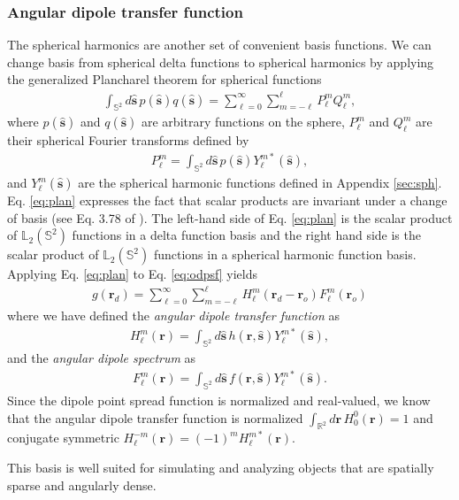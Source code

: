 \documentclass[]{osa-article}
\providecommand{\mb}[1]{\mathbf{#1}}
\providecommand{\ro}{\mathbf{\mathbf{r}}_o}
\providecommand{\rd}{\mathbf{r}_d}
\providecommand{\mh}[1]{\mathbf{\hat{#1}}}
\providecommand{\mbb}[1]{\mathbb{#1}}
\providecommand{\lmsum}{\sum_{\ell=0}^\infty\sum_{m=-\ell}^{\ell}}
\providecommand{\ints}[1]{\int_{\mbb{S}^{#1}}}
\begin{document}
\subsubsection{Angular dipole transfer function}
The spherical harmonics are another set of convenient basis functions. We can
change basis from spherical delta functions to spherical harmonics by applying
the generalized Plancharel theorem for spherical functions
\begin{align}
  \ints{2}d\mh{s}{}\, p(\mh{s})q(\mh{s}) = \lmsum P_\ell^m Q_\ell^m, \label{eq:plan}
\end{align}
where $p(\mh{s})$ and $q(\mh{s})$ are arbitrary functions on the sphere, $P_\ell^m$ and $Q_\ell^m$ are their spherical Fourier transforms defined by
\begin{align}
  P_\ell^m = \int_{\mbb{S}^2}d\mh{s}\, p(\mh{s})Y_\ell^{m*}(\mh{s}),
\end{align}
and $Y_{\ell}^m(\mh{s})$ are the spherical harmonic functions defined in
Appendix \ref{sec:sph}. Eq. \ref{eq:plan} expresses the fact that scalar
products are invariant under a change of basis (see Eq. 3.78 of
\cite{barrett2004}). The left-hand side of Eq. \ref{eq:plan} is the scalar
product of $\mbb{L}_2(\mbb{S}^2)$ functions in a delta function basis and the
right hand side is the scalar product of $\mbb{L}_2(\mbb{S}^2)$ functions in a
spherical harmonic function basis. Applying Eq. \ref{eq:plan} to Eq.
\ref{eq:odpsf} yields
\begin{align}
  g(\rd) = \lmsum H_\ell^m(\rd - \ro)F_\ell^m(\ro) \label{eq:atf-form}
\end{align}
where we have defined the \textit{angular dipole transfer function} as
\begin{align}
  H_\ell^m(\mb{r}) = \int_{\mbb{S}^2}d\mh{s}\, h(\mb{r}, \mh{s})Y_{\ell}^{m*}(\mh{s}),\label{eq:atf-prep} 
\end{align}
and the \textit{angular dipole spectrum} as
\begin{align}
  F_\ell^m(\mb{r}) = \int_{\mbb{S}^2}d\mh{s}\, f(\mb{r}, \mh{s})Y_{\ell}^{m*}(\mh{s}).
\end{align}
Since the dipole point spread function is normalized and real-valued, we know
that the angular dipole transfer function is normalized
$\int_{\mbb{R}^2}d\mb{r}\, H_0^0(\mb{r}) = 1$ and conjugate symmetric
$H_\ell^{-m}(\mb{r}) = (-1)^mH_\ell^{m*}(\mb{r})$.

This basis is well suited for simulating and analyzing objects that are
spatially sparse and angularly dense.
\end{document}
